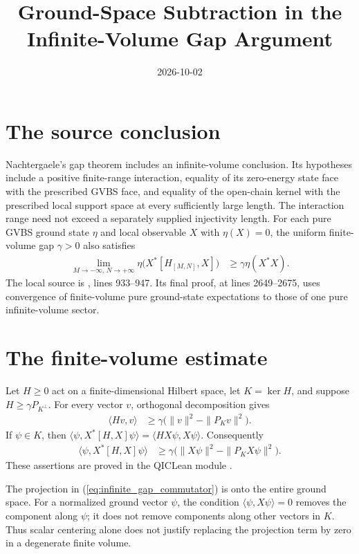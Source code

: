 \documentclass{article}
\title{Ground-Space Subtraction in the Infinite-Volume Gap Argument}
\author{}
\date{2026-10-02}
\begin{document}
\maketitle
{}

\section{The source conclusion}
Nachtergaele's gap theorem \cite{Nachtergaele1996Spectral} includes an
infinite-volume conclusion. Its hypotheses include a positive finite-range
interaction, equality of its zero-energy state face with the prescribed
GVBS face, and equality of the open-chain kernel with the prescribed
local support space at every sufficiently large length. The interaction
range need not exceed a separately supplied injectivity length.
For each pure GVBS ground state $\eta$ and local observable $X$ with $\eta(X)=0$, the uniform finite-volume gap
$\gamma>0$ also satisfies
\begin{align}
    \lim_{M\to-\infty,\,N\to+\infty}
        \eta\bigl(X^*[H_{[M,N]},X]\bigr)
        &\geq\gamma\eta(X^*X).
    \label{eq:infinite_gap_source}
\end{align}
The local source is ,
lines 933--947. Its final proof, at lines 2649--2675, uses convergence
of finite-volume pure ground-state expectations to those of one pure
infinite-volume sector.

\section{The finite-volume estimate}
Let $H\geq0$ act on a finite-dimensional Hilbert space, let
$K=\ker H$, and suppose $H\geq\gamma P_{K^\perp}$. For every vector
$v$, orthogonal decomposition gives
\begin{align}
    \langle Hv,v\rangle
        &\geq\gamma\bigl(\|v\|^2-\|P_Kv\|^2\bigr).
    \label{eq:infinite_gap_subtraction}
\end{align}
If $\psi\in K$, then
$\langle\psi,X^*[H,X]\psi\rangle=\langle HX\psi,X\psi\rangle$.
Consequently
\begin{align}
    \langle\psi,X^*[H,X]\psi\rangle
        &\geq\gamma\bigl(\|X\psi\|^2-\|P_KX\psi\|^2\bigr).
    \label{eq:infinite_gap_commutator}
\end{align}
These assertions are proved in the QICLean module
.

The projection in (\ref{eq:infinite_gap_commutator}) is onto the entire
ground space. For a normalized ground vector $\psi$, the condition
$\langle\psi,X\psi\rangle=0$ removes the component along $\psi$;
it does not remove components along other vectors in $K$. Thus scalar
centering alone does not justify replacing the projection term by zero
in a degenerate finite volume.
\end{document}
